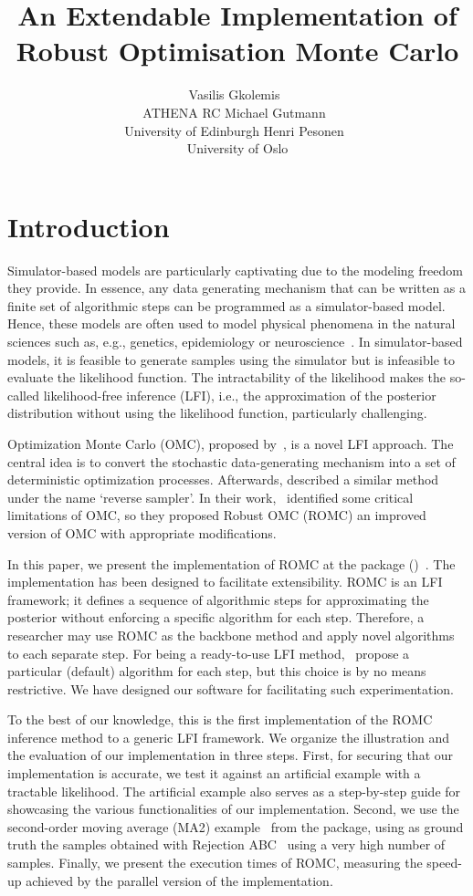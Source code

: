 \documentclass[nojss]{jss}
\author{Vasilis Gkolemis~\orcidlink{0000-0002-2636-0245}\\ATHENA RC \And
  Michael Gutmann~\orcidlink{0000-0002-5329-9910}\\University of Edinburgh \And
  Henri Pesonen~\orcidlink{0000-0003-4500-2926}\\University of Oslo}
\title{An Extendable \proglang{Python} Implementation of Robust Optimisation Monte Carlo}
\begin{document}
\section[Introduction]{Introduction}
\label{sec:intro}

Simulator-based models are particularly captivating due to the
modeling freedom they provide. In essence, any data generating
mechanism that can be written as a finite set of algorithmic steps can
be programmed as a simulator-based model. Hence, these models are
often used to model physical phenomena in the natural sciences such
as, e.g., genetics, epidemiology or neuroscience~\citet{gutmann2016,
  lintusaari2017, sisson2018, cranmer2020}. In simulator-based models,
it is feasible to generate samples using the simulator but is
infeasible to evaluate the likelihood function. The intractability of
the likelihood makes the so-called likelihood-free inference (LFI),
i.e., the approximation of the posterior distribution without using
the likelihood function, particularly challenging.

Optimization Monte Carlo (OMC), proposed by~\citet{Meeds2015}, is a
novel LFI approach. The central idea is to convert the stochastic
data-generating mechanism into a set of deterministic optimization
processes. Afterwards, \citet{Forneron2016} described a similar method
under the name `reverse sampler'. In their work,~\citet{Ikonomov2019}
identified some critical limitations of OMC, so they proposed Robust
OMC (ROMC) an improved version of OMC with appropriate modifications.

In this paper, we present the implementation of ROMC at the
 package  ()~\citet{1708.00707}. The implementation has been designed
to facilitate extensibility. ROMC is an LFI framework; it defines a
sequence of algorithmic steps for approximating the posterior without
enforcing a specific algorithm for each step. Therefore, a researcher
may use ROMC as the backbone method and apply novel algorithms to each
separate step. For being a ready-to-use LFI
method,~\citet{Ikonomov2019} propose a particular (default) algorithm
for each step, but this choice is by no means restrictive. We have
designed our software for facilitating such experimentation.

To the best of our knowledge, this is the first implementation of the
ROMC inference method to a generic LFI framework. We organize the
illustration and the evaluation of our implementation in three
steps. First, for securing that our implementation is accurate, we
test it against an artificial example with a tractable likelihood. The
artificial example also serves as a step-by-step guide for showcasing
the various functionalities of our implementation. Second, we use the
second-order moving average (MA2) example~\citet{Marin2012} from the
 package, using as ground truth the samples obtained with
Rejection ABC~\citet{lintusaari2017} using a very high number of
samples. Finally, we present the execution times of ROMC, measuring
the speed-up achieved by the parallel version of the implementation.
\end{document}
